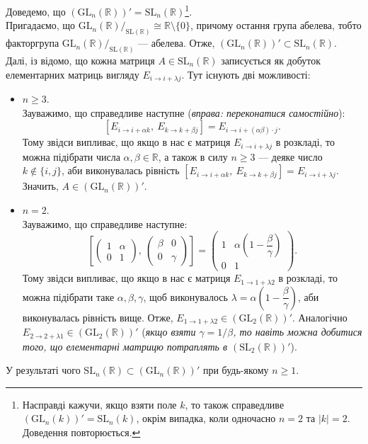 \documentclass{math_library}
\begin{document}
\begin{example}
Доведемо, що $(\mathrm{GL}_n(\mathbb{R}))' = \mathrm{SL}_n(\mathbb{R})$\footnote{Насправді кажучи, якщо взяти поле $k$, то також справедливе $(\mathrm{GL}_n(k))' = \mathrm{SL}_n(k)$, окрім випадка, коли одночасно $n =2$ та $|k| = 2$. Доведення повторюється.}.
\bigskip \\
Пригадаємо, що ${\mathrm{GL}_n(\mathbb{R})}/_{\mathrm{SL}(\mathbb{R})} \cong \mathbb{R} \setminus \{0\}$, причому остання група абелева, тобто факторгрупа ${\mathrm{GL}_n(\mathbb{R})}/_{\mathrm{SL}(\mathbb{R})}$ --- абелева. Отже, $(\mathrm{GL}_n(\mathbb{R}))' \subset \mathrm{SL}_n(\mathbb{R})$.
\bigskip \\
Далі, із  відомо, що кожна матриця $A \in \mathrm{SL}_n(\mathbb{R})$ записується як добуток елементарних матриць вигляду $E_{i \to i+\lambda j}$. Тут існують дві можливості:
\begin{itemize}[wide=0pt]
\item $n \geq 3$.\\
Зауважимо, що справедливе наступне (\textit{вправа: переконатися самостійно}):
\[
[E_{i \to i+\alpha k},\ E_{k \to k+\beta j}] = E_{i \to i + (\alpha \beta) \cdot j}.
\]
Тому звідси випливає, що якщо в нас є матриця $E_{i \to i + \lambda j}$ в розкладі, то можна підібрати числа $\alpha,\beta \in \mathbb{R}$, а також в силу $n \geq 3$ --- деяке число $k \notin \{i,j\}$, аби виконувалась рівність $[E_{i \to i+\alpha k},\ E_{k \to k+\beta j}] = E_{i \to i+\lambda j}$. Значить, $A \in (\mathrm{GL}_n(\mathbb{R}))'$.

\item $n = 2$.\\
Зауважимо, що справедливе наступне:
\[
\left[ \begin{pmatrix}
1 & \alpha \\
0 & 1
\end{pmatrix},\ \begin{pmatrix}
\beta & 0 \\
0 & \gamma
\end{pmatrix} \right] = \begin{pmatrix}
1 & \alpha \left( 1- \dfrac{\beta}{\gamma} \right) \\
0 & 1
\end{pmatrix}.
\]
Тому звідси випливає, що якщо в нас є матриця $E_{1 \to 1 + \lambda 2}$ в розкладі, то можна підібрати таке $\alpha,\beta,\gamma$, щоб виконувалось $\lambda = \alpha \left(1 - \dfrac{\beta}{\gamma}\right)$, аби виконувалась рівність вище. Отже, $E_{1 \to 1 + \lambda 2} \in (\mathrm{GL}_2(\mathbb{R}))'$. Аналогічно $E_{2 \to 2 + \lambda 1} \in (\mathrm{GL}_2(\mathbb{R}))'$ (\textit{якщо взяти $\gamma = 1/\beta$, то навіть можна добитися того, що елементарні матрицю потраплять в $(\mathrm{SL}_2(\mathbb{R}))'$}).
\end{itemize}
У результаті чого $\mathrm{SL}_n(\mathbb{R}) \subset (\mathrm{GL}_n(\mathbb{R}))'$ при будь-якому $n \geq 1$.
\end{example}
\end{document}
